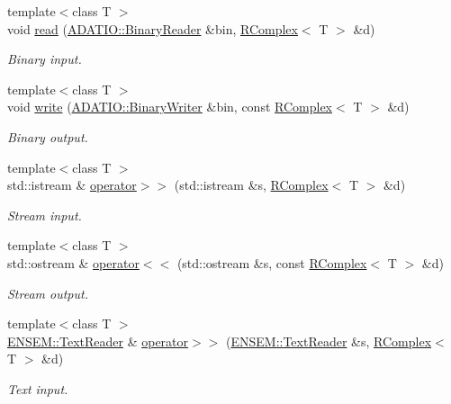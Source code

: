 \begin{DoxyCompactItemize}
{\footnotesize template$<$class T $>$ }\\void \mbox{\hyperlink{group__rcomplex_ga26562c626033349312f9fb8fe7cdabcf}{read}} (\mbox{\hyperlink{classADATIO_1_1BinaryReader}{A\+D\+A\+T\+I\+O\+::\+Binary\+Reader}} \&bin, \mbox{\hyperlink{classENSEM_1_1RComplex}{R\+Complex}}$<$ T $>$ \&d)
\begin{DoxyCompactList}\small\item\em Binary input. \end{DoxyCompactList}\item 
{\footnotesize template$<$class T $>$ }\\void \mbox{\hyperlink{group__rcomplex_ga5087feb4530a8e07f00227de0852c625}{write}} (\mbox{\hyperlink{classADATIO_1_1BinaryWriter}{A\+D\+A\+T\+I\+O\+::\+Binary\+Writer}} \&bin, const \mbox{\hyperlink{classENSEM_1_1RComplex}{R\+Complex}}$<$ T $>$ \&d)
\begin{DoxyCompactList}\small\item\em Binary output. \end{DoxyCompactList}\item 
{\footnotesize template$<$class T $>$ }\\std\+::istream \& \mbox{\hyperlink{group__rcomplex_ga8c6191376b048bab19190ecad0d19772}{operator$>$$>$}} (std\+::istream \&s, \mbox{\hyperlink{classENSEM_1_1RComplex}{R\+Complex}}$<$ T $>$ \&d)
\begin{DoxyCompactList}\small\item\em Stream input. \end{DoxyCompactList}\item 
{\footnotesize template$<$class T $>$ }\\std\+::ostream \& \mbox{\hyperlink{group__rcomplex_ga3e9d2c0a2fe66eca65cad22143bae236}{operator$<$$<$}} (std\+::ostream \&s, const \mbox{\hyperlink{classENSEM_1_1RComplex}{R\+Complex}}$<$ T $>$ \&d)
\begin{DoxyCompactList}\small\item\em Stream output. \end{DoxyCompactList}\item 
{\footnotesize template$<$class T $>$ }\\\mbox{\hyperlink{classENSEM_1_1TextReader}{E\+N\+S\+E\+M\+::\+Text\+Reader}} \& \mbox{\hyperlink{group__rcomplex_ga6dccaeb2f80acd5c96bc96d929a72852}{operator$>$$>$}} (\mbox{\hyperlink{classENSEM_1_1TextReader}{E\+N\+S\+E\+M\+::\+Text\+Reader}} \&s, \mbox{\hyperlink{classENSEM_1_1RComplex}{R\+Complex}}$<$ T $>$ \&d)
\begin{DoxyCompactList}\small\item\em Text input. \end{DoxyCompactList}\item 

\end{DoxyCompactItemize}
